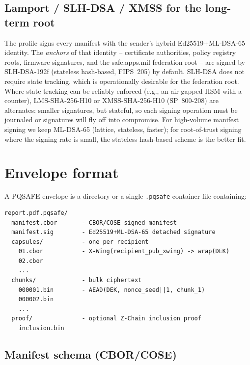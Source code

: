 \documentclass[11pt,a4paper]{article}
\begin{document}
\subsection{Lamport / SLH-DSA / XMSS for the long-term root}

The profile signs every manifest with the sender's hybrid
Ed25519+ML-DSA-65 identity. The \emph{anchors} of that identity --
certificate authorities, policy registry roots, firmware signatures,
and the safe.apps.mil federation root -- are signed by SLH-DSA-192f
(stateless hash-based, FIPS~205) by default. SLH-DSA does not require
state tracking, which is operationally desirable for the federation
root. Where state tracking can be reliably enforced (e.g., an
air-gapped HSM with a counter), LMS-SHA-256-H10 or XMSS-SHA-256-H10
(SP~800-208) are alternates: smaller signatures, but stateful, so
each signing operation must be journaled or signatures will fly off
into compromise. For high-volume manifest signing we keep ML-DSA-65
(lattice, stateless, faster); for root-of-trust signing where the
signing rate is small, the stateless hash-based scheme is the
better fit.

\section{Envelope format}
\label{sec:envelope}

A PQSAFE envelope is a directory or a single \texttt{.pqsafe} container
file containing:

\begin{verbatim}
report.pdf.pqsafe/
  manifest.cbor       - CBOR/COSE signed manifest
  manifest.sig        - Ed25519+ML-DSA-65 detached signature
  capsules/           - one per recipient
    01.cbor           - X-Wing(recipient_pub_xwing) -> wrap(DEK)
    02.cbor
    ...
  chunks/             - bulk ciphertext
    000001.bin        - AEAD(DEK, nonce_seed||1, chunk_1)
    000002.bin
    ...
  proof/              - optional Z-Chain inclusion proof
    inclusion.bin
\end{verbatim}

\subsection{Manifest schema (CBOR/COSE)}
\end{document}
